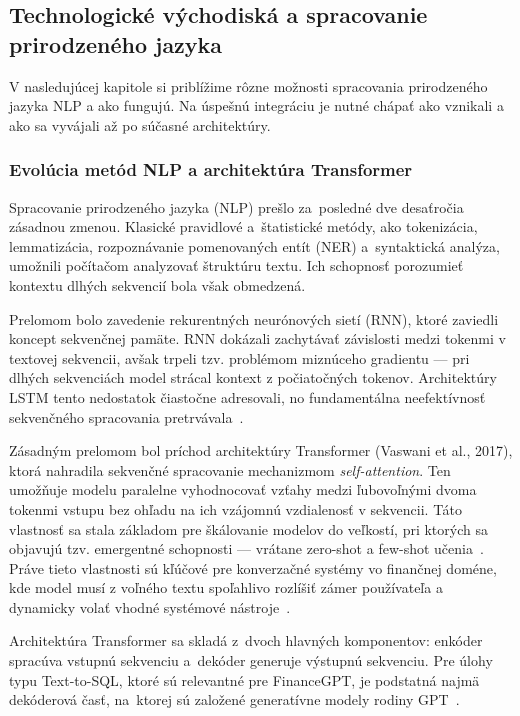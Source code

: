 \subsection{Technologické východiská a spracovanie prirodzeného jazyka}

V nasledujúcej kapitole si priblížime rôzne možnosti spracovania prirodzeného
jazyka NLP a ako fungujú. Na úspešnú integráciu je nutné chápať ako vznikali a ako
sa vyvájali až po súčasné architektúry.

\subsubsection{Evolúcia metód NLP a architektúra Transformer}

Spracovanie prirodzeného jazyka (NLP) prešlo za~posledné dve desaťročia zásadnou
zmenou. Klasické pravidlové a~štatistické metódy, ako tokenizácia, lemmatizácia,
rozpoznávanie pomenovaných entít (NER) a~syntaktická analýza, umožnili počítačom analyzovať
štruktúru textu. Ich schopnosť porozumieť kontextu dlhých sekvencií bola však
obmedzená.

Prelomom bolo zavedenie rekurentných neurónových sietí (RNN), ktoré zaviedli koncept
sekvenčnej pamäte. RNN dokázali zachytávať závislosti medzi tokenmi v textovej
sekvencii, avšak trpeli tzv. problémom miznúceho gradientu — pri dlhých
sekvenciách model strácal kontext z počiatočných tokenov. Architektúry LSTM tento
nedostatok čiastočne adresovali, no fundamentálna neefektívnosť sekvenčného
spracovania pretrvávala~\cite{lipton2015}.

Zásadným prelomom bol príchod architektúry Transformer (Vaswani et al., 2017), ktorá
nahradila sekvenčné spracovanie mechanizmom \textit{self-attention}. Ten umožňuje
modelu paralelne vyhodnocovať vzťahy medzi ľubovoľnými dvoma tokenmi vstupu bez ohľadu
na ich vzájomnú vzdialenosť v sekvencii. Táto vlastnosť sa stala základom pre
škálovanie modelov do veľkostí, pri ktorých sa objavujú tzv. emergentné
schopnosti — vrátane zero-shot a few-shot učenia~\cite{brown2020gpt3, wei2022cot}. %
Práve tieto vlastnosti sú kľúčové pre konverzačné systémy vo finančnej doméne, kde
model musí z voľného textu spoľahlivo rozlíšiť zámer používateľa a dynamicky volať
vhodné systémové nástroje~\cite{vaswani2017, zhao2023}.

Architektúra Transformer sa skladá z~dvoch hlavných komponentov: enkóder
spracúva vstupnú sekvenciu a~dekóder generuje výstupnú sekvenciu. Pre úlohy typu Text-to-SQL,
ktoré sú relevantné pre FinanceGPT, je podstatná najmä dekóderová časť, na~ktorej
sú založené generatívne modely rodiny GPT~\cite{rothman2024transformers}.

